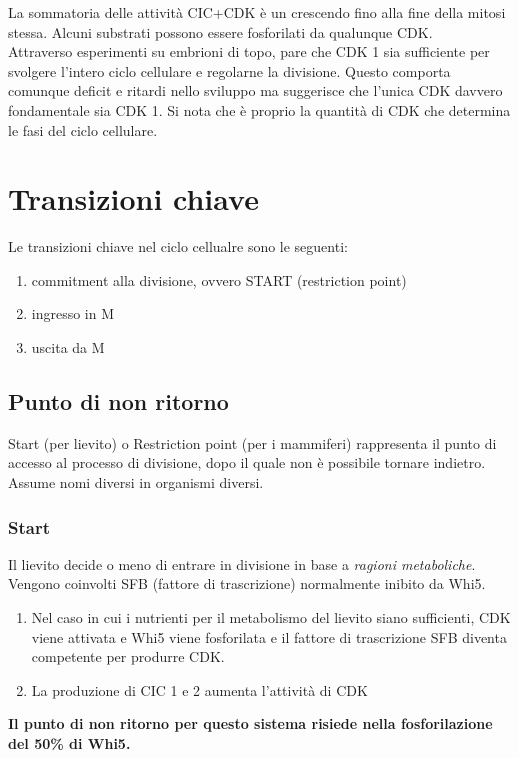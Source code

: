            La sommatoria delle attività CIC+CDK è un crescendo fino alla fine della mitosi stessa. Alcuni substrati possono essere fosforilati da qualunque CDK.\\
            Attraverso esperimenti su embrioni di topo, pare che CDK 1 sia sufficiente per svolgere l'intero ciclo cellulare e regolarne la divisione. Questo comporta comunque deficit e ritardi nello sviluppo ma suggerisce che l'unica CDK davvero fondamentale sia CDK 1.
            Si nota che è proprio la quantità di CDK che determina le fasi del ciclo cellulare. 
        
\section{Transizioni chiave}
        Le transizioni chiave nel ciclo cellualre sono le seguenti:
        \begin{enumerate}
            \item commitment alla divisione, ovvero START (restriction point)
            \item ingresso in M
            \item uscita da M
        \end{enumerate}
        
        \subsection{Punto di non ritorno}
            Start (per lievito) o Restriction point (per i mammiferi) rappresenta il punto di accesso al processo di divisione, dopo il quale non è possibile tornare indietro. Assume nomi diversi in organismi diversi.
            
            \subsubsection{Start}
                Il lievito decide o meno di entrare in divisione in base a \textit{ragioni metaboliche}. Vengono coinvolti SFB (fattore di trascrizione) normalmente inibito da Whi5. 
                \begin{enumerate}
                    \item Nel caso in cui i nutrienti per il metabolismo del lievito siano sufficienti, CDK viene attivata e Whi5 viene fosforilata e il fattore di trascrizione SFB diventa competente per produrre CDK.
                    \item La produzione di CIC 1 e 2 aumenta l'attività di CDK 
                \end{enumerate}
                \textbf{Il punto di non ritorno per questo sistema risiede nella fosforilazione del 50\% di Whi5.}
            
